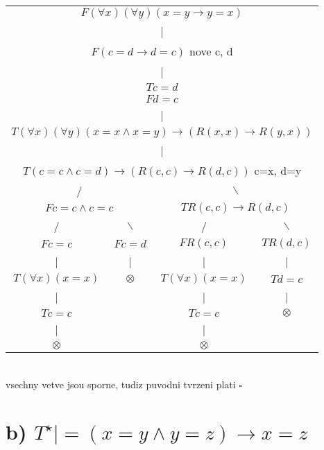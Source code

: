 \documentclass[a4paper]{article}
\begin{document}
\begin{tabular}{ c c c c }
    \multicolumn{4}{c}{$F(\forall x)(\forall y)(x=y\rightarrow y=x)$} \\
    \multicolumn{4}{c}{|} \\
    \multicolumn{4}{c}{$F(c=d\rightarrow d=c)$ nove c, d} \\
    \multicolumn{4}{c}{|} \\
    \multicolumn{4}{c}{$T c=d$}\\
    \multicolumn{4}{c}{$F d=c$}\\
    \multicolumn{4}{c}{|} \\
    \multicolumn{4}{c}{$T(\forall x)(\forall y)(x=x \wedge x=y)\rightarrow(R(x,x)\rightarrow R(y,x))$}\\
    \multicolumn{4}{c}{|} \\
    \multicolumn{4}{c}{$T(c=c \wedge c=d) \rightarrow (R(c,c) \rightarrow R(d,c))$ c=x, d=y}\\ 
    \multicolumn{2}{c}{/} & \multicolumn{2}{c}{$\backslash$} \\
    \multicolumn{2}{c}{$F c=c \wedge c=c$} & \multicolumn{2}{c}{$T R(c,c) \rightarrow R(d,c)$} \\
    / & $\backslash$ & / & $\backslash$ \\
    $F c=c$ & $F c=d$ & $FR(c,c)$ & $TR(d,c)$  \\ 
    | & | & | & | \\
    $T(\forall x)(x=x)$ & $\otimes$ &  $T(\forall x)(x=x)$ & $T d=c$ \\  
    | &  & | & | \\
    $T c=c$ &  & $T c=c$ & $\otimes$ \\
    | &  & | &  \\
    $\otimes$ &  & $\otimes$ &     
\end{tabular}
\\
vsechny vetve jsou sporne, tudiz puvodni tvrzeni plati $\square$



\section*{b)  $T^\star |= (x = y \wedge y = z) \rightarrow x = z$}
\end{document}
